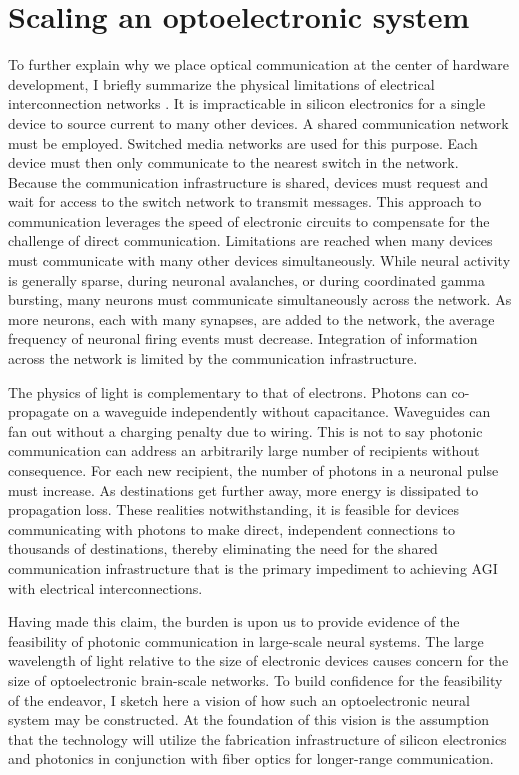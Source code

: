 \documentclass[twocolumn]{article}
\begin{document}
\section{\label{sec:communication}Scaling an optoelectronic system}
To further explain why we place optical communication at the center of hardware development, I briefly summarize the physical limitations of electrical interconnection networks \cite{hepa2012}. It is impracticable in silicon electronics for a single device to source current to many other devices. A shared communication network must be employed. Switched media networks are used for this purpose. Each device must then only communicate to the nearest switch in the network. Because the communication infrastructure is shared, devices must request and wait for access to the switch network to transmit messages. This approach to communication leverages the speed of electronic circuits to compensate for the challenge of direct communication. Limitations are reached when many devices must communicate with many other devices simultaneously. While neural activity is generally sparse, during neuronal avalanches, or during coordinated gamma bursting, many neurons must communicate simultaneously across the network. As more neurons, each with many synapses, are added to the network, the average frequency of neuronal firing events must decrease. Integration of information across the network is limited by the communication infrastructure.

The physics of light is complementary to that of electrons. Photons can co-propagate on a waveguide independently without capacitance. Waveguides can fan out without a charging penalty due to wiring. This is not to say photonic communication can address an arbitrarily large number of recipients without consequence. For each new recipient, the number of photons in a neuronal pulse must increase. As destinations get further away, more energy is dissipated to propagation loss. These realities notwithstanding, it is feasible for devices communicating with photons to make direct, independent connections to thousands of destinations, thereby eliminating the need for the shared communication infrastructure that is the primary impediment to achieving AGI with electrical interconnections.

Having made this claim, the burden is upon us to provide evidence of the feasibility of photonic communication in large-scale neural systems. The large wavelength of light relative to the size of electronic devices causes concern for the size of optoelectronic brain-scale networks. To build confidence for the feasibility of the endeavor, I sketch here a vision of how such an optoelectronic neural system may be constructed. At the foundation of this vision is the assumption that the technology will utilize the fabrication infrastructure of silicon electronics and photonics in conjunction with fiber optics for longer-range communication. 
\end{document}
